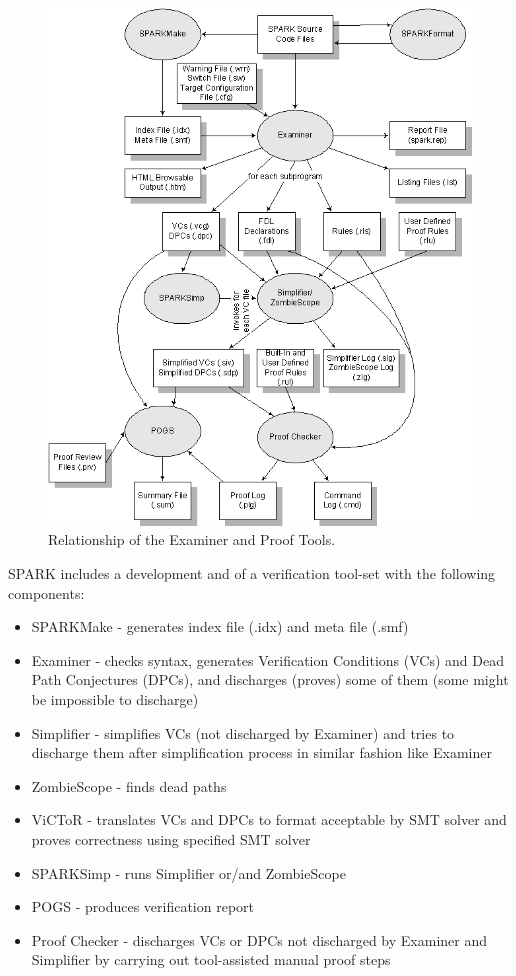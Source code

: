 \begin{figure}[ht]%
    \begin{center}
    	\includegraphics[height=0.6\textheight]{figures/spark-tools.png}    	
    \end{center}
    \caption{Relationship of the Examiner and Proof Tools.\protect\footnotemark}
    \label{figure:spark-tools}
\end{figure}

SPARK includes a development and of a verification tool-set with the following components:
\begin{itemize}
	\item SPARKMake - generates index file (.idx) and meta file (.smf)
	\item Examiner - checks syntax, generates Verification Conditions (VCs) and Dead Path Conjectures (DPCs), and discharges (proves) some of them (some might be impossible to discharge)
	\item Simplifier - simplifies VCs (not discharged by Examiner) and tries to discharge them after simplification process in similar fashion like Examiner
	\item ZombieScope - finds dead paths
	\item ViCToR - translates VCs and DPCs to format acceptable by SMT solver and proves correctness using specified SMT solver
	\item SPARKSimp - runs Simplifier or/and ZombieScope
	\item POGS - produces verification report
	\item Proof Checker - discharges VCs or DPCs not discharged by Examiner and Simplifier by carrying out tool-assisted manual proof steps
\end{itemize}

